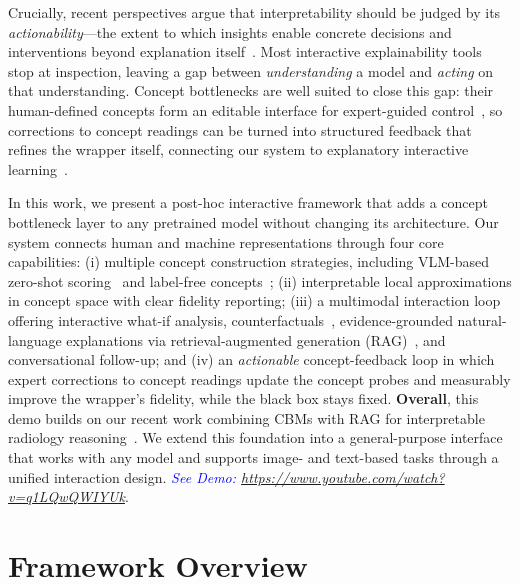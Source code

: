 \documentclass[sigconf,review,screen]{acmart}
\begin{document}
Crucially, recent perspectives argue that interpretability should be judged by its \emph{actionability}---the extent to which insights enable concrete decisions and interventions beyond explanation itself~\cite{Orgad2026Actionable}. Most interactive explainability tools stop at inspection, leaving a gap between \emph{understanding} a model and \emph{acting} on that understanding. Concept bottlenecks are well suited to close this gap: their human-defined concepts form an editable interface for expert-guided control~\cite{Koh2020CBM}, so corrections to concept readings can be turned into structured feedback that refines the wrapper itself, connecting our system to explanatory interactive learning~\cite{Teso2019XIL,Schramowski2020RRC}.


In this work, we present a post-hoc interactive framework that adds a concept bottleneck layer to any pretrained model without changing its architecture. Our system connects human and machine representations through four core capabilities: (i) multiple concept construction strategies, including VLM-based zero-shot scoring~\cite{radford_learning_2021} and label-free concepts~\cite{oikarinen_label-free_2022}; (ii) interpretable local approximations in concept space with clear fidelity reporting; (iii) a multimodal interaction loop offering interactive what-if analysis, counterfactuals~\cite{Wachter2017Counterfactual,Mothilal2020DiCE}, evidence-grounded natural-language explanations via retrieval-augmented generation (RAG)~\cite{Lewis2020RAG}, and conversational follow-up; and (iv) an \emph{actionable} concept-feedback loop in which expert corrections to concept readings update the concept probes and measurably improve the wrapper's fidelity, while the black box stays fixed.
%
\textbf{Overall}, this demo builds on our recent work combining CBMs with RAG for interpretable radiology reasoning~\cite{alam2025cbm,Alam2025ECIR}. We extend this foundation into a general-purpose interface that works with any model and supports image- and text-based tasks through a unified interaction design. \textcolor{blue}{\textit{See Demo: \href{https://www.youtube.com/watch?v=q1LQwQWIYUk}{https://www.youtube.com/watch?v=q1LQwQWIYUk}}}.


\section{Framework Overview}
\end{document}
